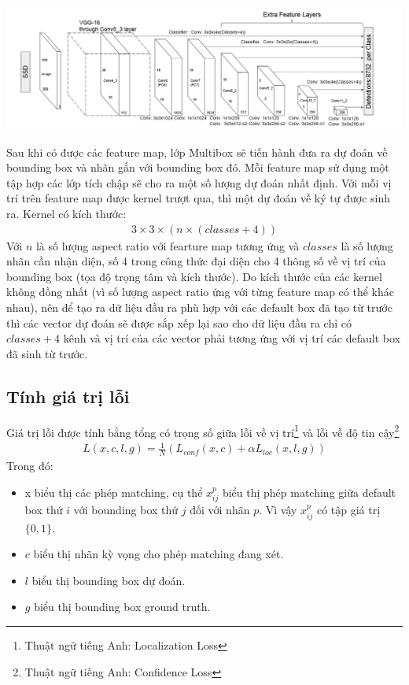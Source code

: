 \documentclass[a4paper,12pt]{article}
\begin{document}
	\begin{center}
		
		\centering
		\includegraphics[width=0.8\linewidth]{SSD_Struture.png}
		\vspace{0.5cm}
	\end{center}
	Sau khi có được các feature map, lớp Multibox sẽ tiến hành đưa ra dự đoán về bounding box và nhãn gắn với bounding box đó. Mỗi feature map sử dụng một tập hợp các lớp tích chập sẽ cho ra một số lượng dự đoán nhất định. Với mỗi vị trí trên feature map được kernel trượt qua, thì một dự đoán về ký tự được sinh ra. Kernel có kích thước:
	\begin{align}
	3 \times 3 \times (n \times (classes + 4))
	\end{align}
	Với $n$ là số lượng aspect ratio với fearture map tương ứng và $classes$ là số lượng nhãn cần nhận diện, số $4$ trong công thức đại diện cho 4 thông số về vị trí của bounding box (tọa độ trọng tâm và kích thước). Do kích thước của các kernel không đồng nhất (vì số lượng aspect ratio ứng với từng feature map có thể khác nhau), nên để tạo ra dữ liệu đầu ra phù hợp với các default box đã tạo từ trước thì các vector dự đoán sẽ được sắp xếp lại sao cho dữ liệu đầu ra chỉ có $classes + 4$ kênh và vị trí của các vector phải tương ứng với vị trí các default box đã sinh từ trước.
	
	\subsection{Tính giá trị lỗi}
	
	Giá trị lỗi được tính bằng tổng có trọng số giữa lỗi về vị trí\footnote{Thuật ngữ tiếng Anh: Localization Loss} và lỗi về độ tin cậy\footnote{Thuật ngữ tiếng Anh: Confidence Loss}
	\begin{align}
	L(x,c,l,g) = \frac{1}{N} (L_{conf}(x,c) + \alpha L_{loc}(x,l,g) )
	\end{align}
	Trong đó:
	\begin{itemize}
		\item x biểu thị các phép matching, cụ thể $x^p_{ij}$ biểu thị phép matching giữa default box thứ $i$ với bounding box thứ $j$ đối với nhãn $p$. Vì vậy $x^p_{ij}$ có tập giá trị $\{0, 1\}$.
		\item $c$ biểu thị nhãn kỳ vọng cho phép matching đang xét.
		\item $l$ biểu thị bounding box dự đoán.
		\item $g$ biểu thị bounding box ground truth.
	\end{itemize}
	
\end{document}
